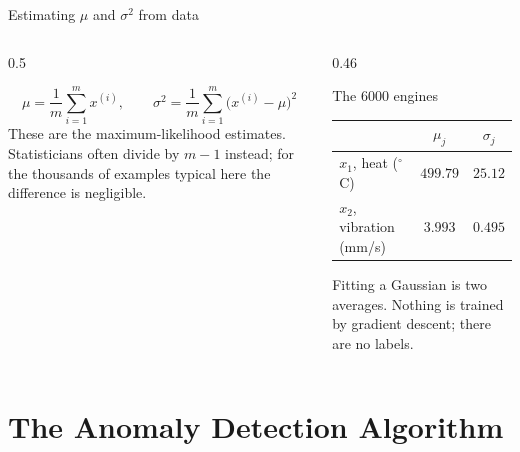 \documentclass[aspectratio=169,10pt]{beamer}
\begin{document}
\begin{frame}{Estimating $\mu$ and $\sigma^2$ from data}
  \begin{columns}[T,onlytextwidth]
    \begin{column}{0.5\textwidth}
      \begin{defnbox}
        \small
        \[ \mu=\frac1m\sum_{i=1}^{m}x^{(i)},\qquad
           \sigma^2=\frac1m\sum_{i=1}^{m}\bigl(x^{(i)}-\mu\bigr)^2 \]
        These are the maximum-likelihood estimates. Statisticians often divide by $m-1$
        instead; for the thousands of examples typical here the difference is negligible.
      \end{defnbox}
    \end{column}
    \begin{column}{0.46\textwidth}
      \footnotesize
      \begin{block}{The 6000 engines}
        \renewcommand{\arraystretch}{1.2}
        \begin{tabular}{@{}lcc@{}}
          \toprule
          & $\mu_j$ & $\sigma_j$\\
          \midrule
          $x_1$, heat ($^\circ$C)     & $499.79$ & $25.12$\\
          $x_2$, vibration (mm/s)     & $3.993$ & $0.495$\\
          \bottomrule
        \end{tabular}
      \end{block}
      \begin{keyidea}
        Fitting a Gaussian is two averages. Nothing is trained by gradient descent; there
        are no labels.
      \end{keyidea}
    \end{column}
  \end{columns}
\end{frame}

\section{The Anomaly Detection Algorithm}
\end{document}

